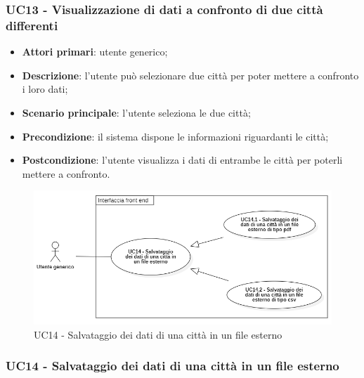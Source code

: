 \subsubsection{UC13 - Visualizzazione di dati a confronto di due città differenti}\label{CasiDUsoCasiDUsoFacoltativiTraUnUtenteEIlFrontEndElencoCasiDUsoUC13VisualizzazioneDiDatiAConfrontoDiDueCittaDifferenti}

\begin{itemize}
	\item \textbf{Attori primari}: utente generico;
	\item \textbf{Descrizione}: l’utente può selezionare due città per poter mettere a confronto i loro dati;
	\item \textbf{Scenario principale}: l’utente seleziona le due città;
	\item \textbf{Precondizione}: il sistema dispone le informazioni riguardanti le città;
	\item \textbf{Postcondizione}: l'utente visualizza i dati di entrambe le città per poterli mettere a confronto.
\end{itemize}



\begin{center}
	\begin{figure}[H]
		\centering\includegraphics[scale=0.7]{../immagini/attori_casi/uc14.png}
		\caption{UC14 - Salvataggio dei dati di una città in un file esterno}
	\end{figure}
\end{center}


\subsubsection{UC14 - Salvataggio dei dati di una città in un file esterno}\label{CasiDUsoCasiDUsoFacoltativiTraUnUtenteEIlFrontEndElencoCasiDUsoUC14SalvataggioDeiDatiDiUnaCittaInUnFileEsterno}



